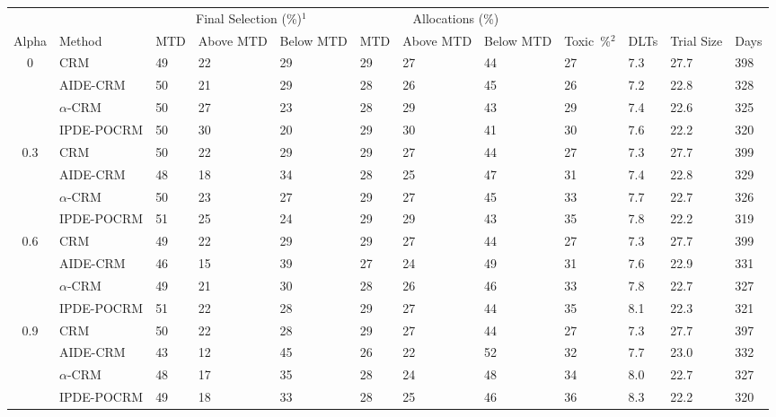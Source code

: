 \begin{tabular*}{\textwidth}{@{\extracolsep\fill}clllllllllll@{\extracolsep\fill}}
\toprule
&  & \multicolumn{3}{c}{Final Selection (\%)$^1$} & \multicolumn{3}{c}{Allocations (\%)} & &  &  &  \\
\multirow{2}{2em}{Alpha} & \multirow{2}{2em}{Method} & \multirow{2}{2em}{MTD} & \multirow{2}{2em}{Above MTD} & \multirow{2}{2em}{Below MTD} & \multirow{2}{2em}{MTD} & \multirow{2}{2em}{Above MTD} & \multirow{2}{2em}{Below MTD} & \multirow{2}{2em}{Toxic~\%$^2$} & \multirow{2}{2em}{DLTs} & \multirow{2}{2em}{Trial Size} & \multirow{2}{2em}{Days}  \\ \\ 
\midrule
\multirow{4}{2em}{0} & CRM & 49 & 22 & 29 & 29 & 27 & 44 & 27 & 7.3 & 27.7 & 398\\
 & AIDE-CRM & 50 & 21 & 29 & 28 & 26 & 45 & 26 & 7.2 & 22.8 & 328\\
 & $\alpha$-CRM & 50 & 27 & 23 & 28 & 29 & 43 & 29 & 7.4 & 22.6 & 325\\
 & IPDE-POCRM & 50 & 30 & 20 & 29 & 30 & 41 & 30 & 7.6 & 22.2 & 320\\
\midrule
\multirow{4}{2em}{0.3} & CRM & 50 & 22 & 29 & 29 & 27 & 44 & 27 & 7.3 & 27.7 & 399\\
 & AIDE-CRM & 48 & 18 & 34 & 28 & 25 & 47 & 31 & 7.4 & 22.8 & 329\\
 & $\alpha$-CRM & 50 & 23 & 27 & 29 & 27 & 45 & 33 & 7.7 & 22.7 & 326\\
 & IPDE-POCRM & 51 & 25 & 24 & 29 & 29 & 43 & 35 & 7.8 & 22.2 & 319\\
\midrule
\multirow{4}{2em}{0.6} & CRM & 49 & 22 & 29 & 29 & 27 & 44 & 27 & 7.3 & 27.7 & 399\\
 & AIDE-CRM & 46 & 15 & 39 & 27 & 24 & 49 & 31 & 7.6 & 22.9 & 331\\
 & $\alpha$-CRM & 49 & 21 & 30 & 28 & 26 & 46 & 33 & 7.8 & 22.7 & 327\\
 & IPDE-POCRM & 51 & 22 & 28 & 29 & 27 & 44 & 35 & 8.1 & 22.3 & 321\\
\midrule
\multirow{4}{2em}{0.9} & CRM & 50 & 22 & 28 & 29 & 27 & 44 & 27 & 7.3 & 27.7 & 397\\
 & AIDE-CRM & 43 & 12 & 45 & 26 & 22 & 52 & 32 & 7.7 & 23.0 & 332\\
 & $\alpha$-CRM & 48 & 17 & 35 & 28 & 24 & 48 & 34 & 8.0 & 22.7 & 327\\
 & IPDE-POCRM & 49 & 18 & 33 & 28 & 25 & 46 & 36 & 8.3 & 22.2 & 320\\
\bottomrule
\end{tabular*}
